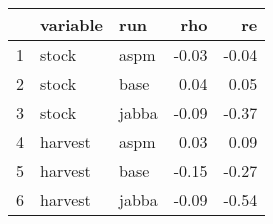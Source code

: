 \begin{table}[ht]
\centering
\begin{tabular}{rllrr}
  \hline
 & variable & run & rho & re \\ 
  \hline
1 & stock & aspm & -0.03 & -0.04 \\ 
  2 & stock & base & 0.04 & 0.05 \\ 
  3 & stock & jabba & -0.09 & -0.37 \\ 
  4 & harvest & aspm & 0.03 & 0.09 \\ 
  5 & harvest & base & -0.15 & -0.27 \\ 
  6 & harvest & jabba & -0.09 & -0.54 \\ 
   \hline
\end{tabular}
\end{table}


